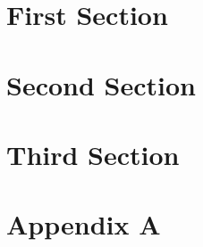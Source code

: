 \documentclass{article}
\begin{document}
\section{First Section}
\section{Second Section}
\section{Third Section}
\pdchapterappendix
\section{Appendix A}
\end{document}
